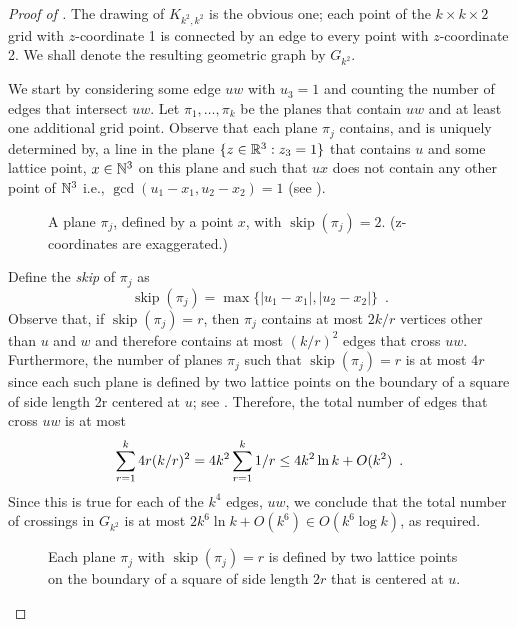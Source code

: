 \documentclass{patmorin}
\DeclareMathOperator{\skp}{skip}
\begin{document}
\begin{proof}[Proof of ]
  The drawing of $K_{k^2,k^2}$ is the obvious one; each point of the
  $k\times k\times2$ grid with $z$-coordinate 1 is connected by an edge
  to every point with $z$-coordinate 2.  We shall denote the resulting
  geometric graph by $G_{k^2}$.
  
  We start by considering some edge $uw$ with $u_3=1$ and counting the
  number of edges that intersect $uw$.  Let $\pi_1,\ldots,\pi_k$ be
  the planes that contain $uw$ and at least one additional grid point.
  Observe that each plane $\pi_j$ contains, and is uniquely determined
  by, a line in the plane $\{z\in\mathbb{R}^3: z_3=1\}$ that contains $u$ and
  some lattice point, $x\in\mathbb{N}^3$ on this plane and such that $ux$ does
  not contain any other point of $\mathbb{N}^3$ i.e., $\gcd(u_1-x_1,u_2-x_2)=1$
  (see ).
  \begin{figure}
    \caption{A plane $\pi_j$, defined by a point $x$, with
      $\skp(\pi_j)=2$. (z-coordinates are exaggerated.)}
  \end{figure}
  Define the \emph{skip} of $\pi_j$ as
  \[
     \skp(\pi_j)=\max\{|u_1-x_1|,|u_2-x_2|\} \enspace .
  \]
  Observe that, if $\skp(\pi_j)=r$, then $\pi_j$ contains at most $2k/r$
  vertices other than $u$ and $w$ and therefore contains at most $(k/r)^2$
  edges that cross $uw$.  Furthermore, the number of planes $\pi_j$
  such that $\skp(\pi_j)=r$ is at most $4r$ since each such plane is
  defined by two lattice points on the boundary of a square of side
  length 2r centered at $u$; see .   Therefore,
  the total number of edges that cross $uw$ is at most
  \begin{equation}
     \sum_{r=1}^k 4r(k/r)^2 = 4k^2\sum_{r=1}^k 1/r 
       \le 4k^2\ln k + O(k^2) \enspace .
        \eqlabel{critical}
  \end{equation}
  Since this is true for each of the $k^4$ edges, $uw$, we conclude
  that the total number of crossings in $G_{k^2}$ is at most $2k^6\ln
  k+O(k^6)\in O(k^6\log k)$, as required.
  \begin{figure}
    \caption{Each plane $\pi_j$ with $\skp(\pi_j)=r$ is defined by two 
      lattice points on the boundary of a square of side length $2r$ that
      is centered at $u$.}
  \end{figure}
\end{proof}
\end{document}
